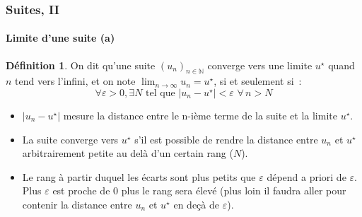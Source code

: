 \documentclass[10pt,notheorems]{beamer}
\theoremstyle{plain}
\theoremstyle{definition} %
\newtheorem{definition}{Définition}
\begin{document}
\begin{frame}
  \frametitle{Suites, II}
  \framesubtitle{Limite d'une suite (a)}
  \hypertarget{slide_suite_limite_1}{}

  \bigskip

  \begin{definition}
    On dit qu'une suite $(u_n)_{n\in\mathbb N}$ converge vers une limite $u^{\star}$ quand $n$ tend vers l'infini, et on note $\lim_{n\rightarrow\infty}u_n = u^{\star}$, si et seulement si~:
    \[
      \forall \varepsilon>0, \exists N\text{ tel que } |u_n-u^{\star}|<\varepsilon\,\, \forall \, n>N
    \]
  \end{definition}

  \bigskip

  \begin{itemize}

  \item $|u_n-u^{\star}|$ mesure la distance entre le n-ième terme de la suite et la limite $u^{\star}$.\newline

  \item La suite converge vers $u^{\star}$ s'il est possible de rendre la distance entre $u_n$ et $u^{\star}$ arbitrairement petite au delà d'un certain rang ($N$).\newline

  \item Le rang à partir duquel les écarts sont plus petits que $\varepsilon$ dépend a priori de $\varepsilon$. Plus $\varepsilon$ est proche de 0 plus le rang sera élevé (plus loin il faudra aller pour contenir la distance entre $u_n$ et $u^{\star}$ en deçà de $\varepsilon$).

  \end{itemize}

\end{frame}
\end{document}
